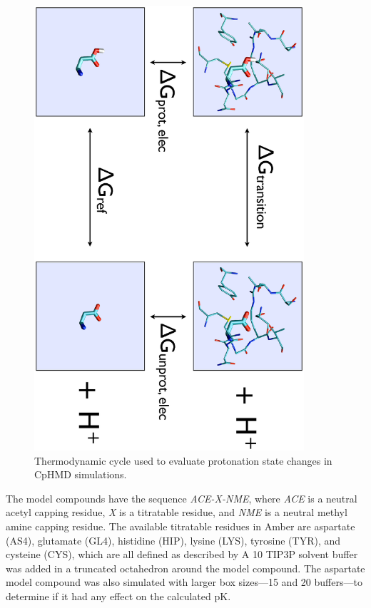 \begin{figure}
   \includegraphics[height=6.5in, angle=90]{ThermoCycle.ps}
   \caption{Thermodynamic cycle used to evaluate protonation state changes in
            CpHMD simulations.}
   \label{fig4:ThermoCycle}
\end{figure}

The model compounds have the sequence \emph{ACE-X-NME}, where \emph{ACE} is a
neutral acetyl capping residue, \emph{X} is a titratable residue, and \emph{NME}
is a neutral methyl amine capping residue.
\cite{Mongan_JComputChem_2004_v25_p2038} The available titratable residues in
Amber are aspartate (AS4), glutamate (GL4), histidine (HIP), lysine (LYS),
tyrosine (TYR), and cysteine (CYS), which are all defined as described by
\citeauthor{Mongan_JComputChem_2004_v25_p2038}
\cite{Mongan_JComputChem_2004_v25_p2038}  A 10 \text{\AA} TIP3P
\cite{Jorgensen_JChemPhys_1983_v79_p926} solvent buffer was added in a truncated
octahedron around the model compound.  The aspartate model compound was also
simulated with larger box sizes---15 \text{\AA} and 20 \text{\AA} buffers---to
determine if it had any effect on the calculated pK.

